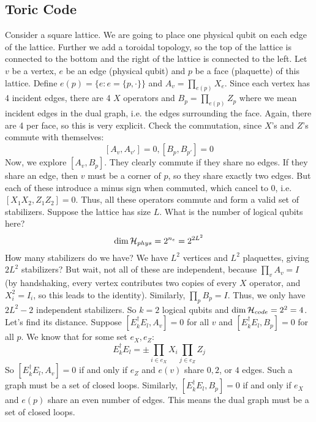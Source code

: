 \subsection{Toric Code}
Consider a square lattice. We are going to place one physical qubit on each edge of the lattice.
Further we add a toroidal topology, so the top of the lattice is connected to the bottom and the right of the lattice is connected to the left.
Let $v$ be a vertex, $e$ be an edge (physical qubit) and $p$ be a face (plaquette) of this lattice. Define $e(p) = \{ e : e = \{p, \cdot\}\}$ and
$A_v = \prod_{e(p)} X_e$. Since each vertex has 4 incident edges, there are 4 $X$ operators and $B_p = \prod_{e(p)} Z_p$
where we mean incident edges in the dual graph, i.e. the edges surrounding the face. Again, there are 4 per face, so this is very explicit.
Check the commutation, since $X$'s and $Z$'s commute with themselves:
\[ [A_v, A_{v'}] = 0, [B_p, B_{p'}] = 0 \]
Now, we explore $[A_v, B_p]$. They clearly commute if they share no edges. If they share an edge, then $v$ must be a corner of $p$,
so they share exactly two edges. But each of these introduce a minus sign when commuted, which cancel to 0, i.e. $[X_1 X_2, Z_1 Z_2] = 0$.
Thus, all these operators commute and form a valid set of stabilizers. Suppose the lattice has size $L$. What is the number of logical qubits here?
\[ \dim \operatorname{\mathcal{H}}_{phys} = 2^{n_e} = 2^{2L^2} \]
How many stabilizers do we have? We have $L^2$ vertices and $L^2$ plaquettes, giving $2L^2$ stabilizers? But wait,
not all of these are independent, because $\prod_v A_v = I$ (by handshaking, every vertex contributes
two copies of every $X$ operator, and $X_i^2 = I_i$, so this leads to the identity). Similarly, $\prod_p B_p = I$. Thus, we only have $2L^2 - 2$ independent
stabilizers. So $k = 2$ logical qubits and $\dim \operatorname{\mathcal{H}}_{code} = 2^2 = 4$. Let's find its distance.
Suppose $[E_k^{\dagger} E_l, A_v] = 0$ for all $v$ and $[E_k^{\dagger} E_l, B_p] = 0$ for all $p$. We know that for some set $e_X, e_Z$:
\[ E_k^{\dagger} E_l = \pm \prod_{i \in e_X} X_i \prod_{j \in e_Z} Z_j \]
So $[E_k^{\dagger} E_l, A_v] = 0$ if and only if $e_Z$ and $e(v)$ share $0, 2$, or $4$ edges.
Such a graph must be a set of closed loops. Similarly, $[E_k^{\dagger} E_l, B_p] = 0$ if and only if $e_X$ and $e(p)$
share an even number of edges. This means the dual graph must be a set of closed loops.
